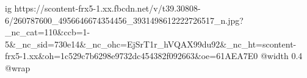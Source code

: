  
 
 
 
 

\ifcmt
  ig https://scontent-frx5-1.xx.fbcdn.net/v/t39.30808-6/260787600_4956646674354456_3931498612222726517_n.jpg?_nc_cat=110&ccb=1-5&_nc_sid=730e14&_nc_ohc=EjSrT1r_hVQAX99du92&_nc_ht=scontent-frx5-1.xx&oh=1c529c7b6298e9732dc454382f092663&oe=61AEA7E0
  @width 0.4
  @wrap 
\fi
